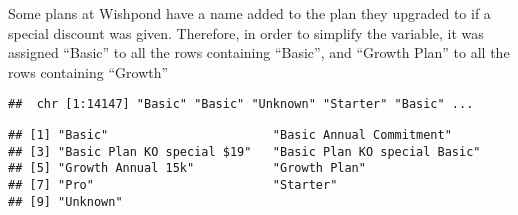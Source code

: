 \documentclass[]{article}
\newenvironment{Shaded}{\begin{snugshade}}{\end{snugshade}}
\newcommand{\KeywordTok}[1]{\textcolor[rgb]{0.13,0.29,0.53}{\textbf{#1}}}
\newcommand{\StringTok}[1]{\textcolor[rgb]{0.31,0.60,0.02}{#1}}
\newcommand{\OperatorTok}[1]{\textcolor[rgb]{0.81,0.36,0.00}{\textbf{#1}}}
\newcommand{\NormalTok}[1]{#1}
\begin{document}
\begin{Shaded}
\end{Shaded}

Some plans at Wishpond have a name added to the plan they upgraded to if
a special discount was given. Therefore, in order to simplify the
variable, it was assigned ``Basic'' to all the rows containing
``Basic'', and ``Growth Plan'' to all the rows containing ``Growth''

\begin{Shaded}
\end{Shaded}

\begin{verbatim}
##  chr [1:14147] "Basic" "Basic" "Unknown" "Starter" "Basic" ...
\end{verbatim}

\begin{Shaded}
\end{Shaded}

\begin{verbatim}
## [1] "Basic"                       "Basic Annual Commitment"    
## [3] "Basic Plan KO special $19"   "Basic Plan KO special Basic"
## [5] "Growth Annual 15k"           "Growth Plan"                
## [7] "Pro"                         "Starter"                    
## [9] "Unknown"
\end{verbatim}

\begin{Shaded}
\end{Shaded}
\end{document}
